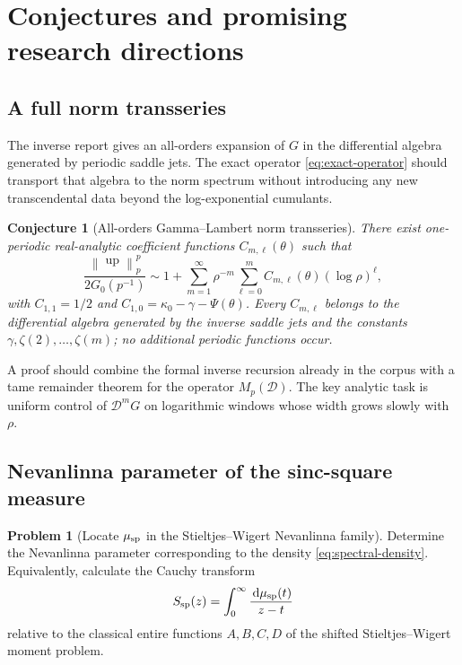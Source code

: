 \documentclass[11pt,oneside]{article}
\numberwithin{equation}{section}
\theoremstyle{plain}
\newtheorem{conjecture}[theorem]{Conjecture}
\theoremstyle{definition}
\newtheorem{problem}[theorem]{Problem}
\theoremstyle{remark}
\newcommand{\Up}{\operatorname{up}}
\newcommand{\dd}{\,\mathrm d}
\newcommand{\Dop}{\mathscr D}
\newcommand{\norm}[1]{\left\lVert#1\right\rVert}
\begin{document}
\section{Conjectures and promising research directions}
\label{sec:future}

\subsection{A full norm transseries}

The inverse report gives an all-orders expansion of $G$ in the differential algebra generated
by periodic saddle jets.  The exact operator \eqref{eq:exact-operator} should transport that
algebra to the norm spectrum without introducing any new transcendental data beyond the
log-exponential cumulants.

\begin{conjecture}[All-orders Gamma--Lambert norm transseries]
\label{conj:full-norm-transseries}
There exist one-periodic real-analytic coefficient functions
$C_{m,\ell}(\theta)$ such that
\begin{equation}
 \frac{\norm{\Up}_p^p}{2G_0(p^{-1})}
 \sim1+\sum_{m=1}^{\infty}\rho^{-m}
 \sum_{\ell=0}^{m}C_{m,\ell}(\theta)(\log\rho)^\ell,
 \label{eq:full-norm-transseries}
\end{equation}
with $C_{1,1}=1/2$ and
$C_{1,0}=\kappa_0-\gamma-\Psi(\theta)$.  Every $C_{m,\ell}$ belongs to the differential
algebra generated by the inverse saddle jets and the constants
$\gamma,\zeta(2),\ldots,\zeta(m)$; no additional periodic functions occur.
\end{conjecture}

A proof should combine the formal inverse recursion already in the corpus with a tame
remainder theorem for the operator $M_p(\Dop)$.  The key analytic task is uniform control of
$\Dop^mG$ on logarithmic windows whose width grows slowly with $\rho$.

\subsection{Nevanlinna parameter of the sinc-square measure}

\begin{problem}[Locate $\mu_{\rm sp}$ in the Stieltjes--Wigert Nevanlinna family]
\label{prob:Nevanlinna}
Determine the Nevanlinna parameter corresponding to the density
\eqref{eq:spectral-density}.  Equivalently, calculate the Cauchy transform
\begin{equation}
 S_{\rm sp}(z)=\int_0^\infty\frac{\dd\mu_{\rm sp}(t)}{z-t}
 \label{eq:spectral-Stieltjes-transform}
\end{equation}
relative to the classical entire functions $A,B,C,D$ of the shifted
Stieltjes--Wigert moment problem.
\end{problem}
\end{document}
